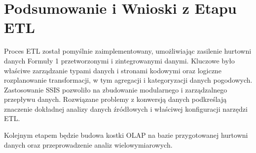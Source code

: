 \documentclass[a4paper,12pt]{article}
\begin{document}
\section{Podsumowanie i Wnioski z Etapu ETL}
Proces ETL został pomyślnie zaimplementowany, umożliwiając zasilenie hurtowni danych Formuły 1 przetworzonymi i zintegrowanymi danymi. Kluczowe było właściwe zarządzanie typami danych i stronami kodowymi oraz logiczne rozplanowanie transformacji, w tym agregacji i kategoryzacji danych pogodowych. Zastosowanie SSIS pozwoliło na zbudowanie modularnego i zarządzalnego przepływu danych. Rozwiązane problemy z konwersją danych podkreślają znaczenie dokładnej analizy danych źródłowych i właściwej konfiguracji narzędzi ETL.

Kolejnym etapem będzie budowa kostki OLAP na bazie przygotowanej hurtowni danych oraz przeprowadzenie analiz wielowymiarowych.

\newpage


\end{document}
